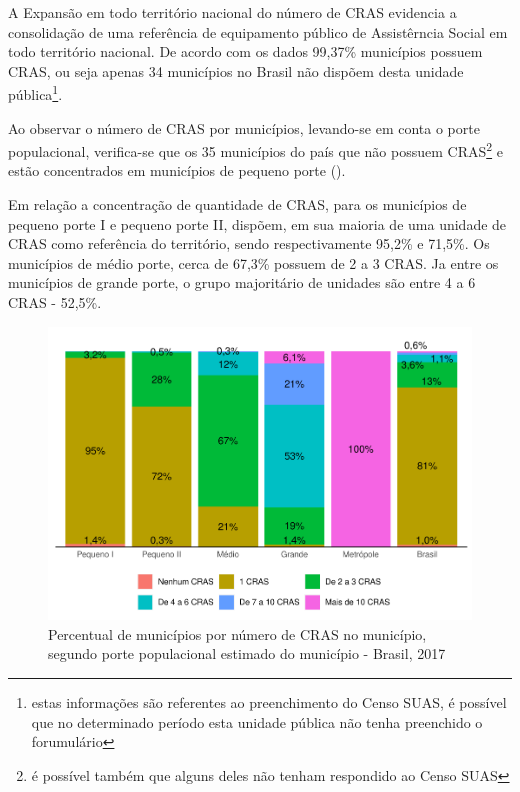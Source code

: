 \documentclass[
  brazilian]{report}
\begin{document}
A Expansão em todo território nacional do número de CRAS evidencia a
consolidação de uma referência de equipamento público de Assistêrncia
Social em todo território nacional. De acordo com os dados 99,37\%
municípios possuem CRAS, ou seja apenas 34 municípios no Brasil não
dispõem desta unidade
pública\footnote{estas informações são referentes ao preenchimento do Censo SUAS, é possível que no determinado período esta unidade pública não tenha preenchido o forumulário}.

Ao observar o número de CRAS por municípios, levando-se em conta o porte
populacional, verifica-se que os 35 municípios do país que não possuem
CRAS\footnote{é possível também que alguns deles não tenham respondido ao Censo SUAS}
e estão concentrados em municípios de pequeno porte
().

Em relação a concentração de quantidade de CRAS, para os municípios de
pequeno porte I e pequeno porte II, dispõem, em sua maioria de uma
unidade de CRAS como referência do território, sendo respectivamente
95,2\% e 71,5\%. Os municípios de médio porte, cerca de 67,3\% possuem
de 2 a 3 CRAS. Ja entre os municípios de grande porte, o grupo
majoritário de unidades são entre 4 a 6 CRAS - 52,5\%.

\begin{figure}
\includegraphics{Censo-SUAS-2022_files/figure-latex/CRAS-porte-1} \caption[Percentual de municípios por número de CRAS no município, segundo porte populacional estimado do município - Brasil, 2017]{Percentual de municípios por número de CRAS no município, segundo porte populacional estimado do município - Brasil, 2017}\label{fig:CRAS-porte}
\end{figure}
\end{document}
